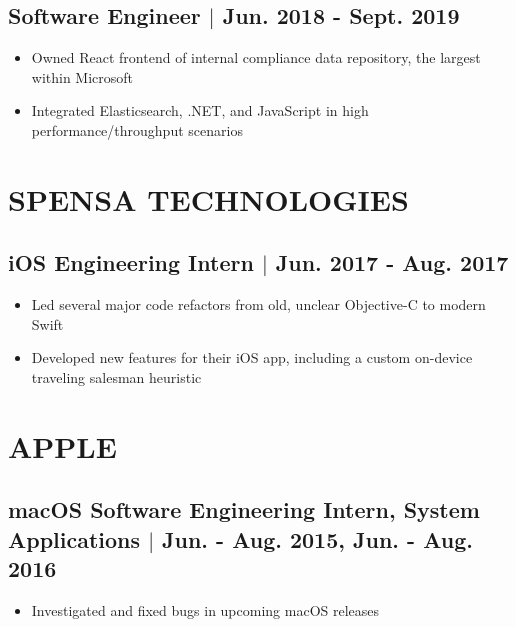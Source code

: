 \documentclass[10pt]{article}
\begin{document}
\subsection{Software Engineer $\vert$ Jun. 2018 - Sept. 2019}
\begin{itemize}
    \item Owned React frontend of internal compliance data repository, the largest within Microsoft
    \item Integrated Elasticsearch, .NET, and JavaScript in high performance/throughput scenarios
\end{itemize}

\section{SPENSA TECHNOLOGIES}
\subsection{iOS Engineering Intern $\vert$ Jun. 2017 - Aug. 2017}
\begin{itemize}
    \item Led several major code refactors from old, unclear Objective-C to modern Swift
    \item Developed new features for their iOS app, including a custom on-device traveling salesman heuristic
\end{itemize}

\section{APPLE}
\subsection{macOS Software Engineering Intern, System Applications $\vert$ Jun. - Aug. 2015, Jun. - Aug. 2016}
\begin{itemize}
    \item Investigated and fixed bugs in upcoming macOS releases
\end{itemize}
\end{document}
